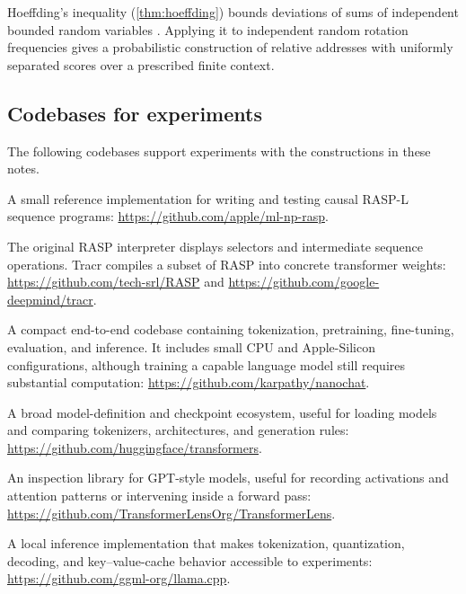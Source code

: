 \documentclass[11pt,twoside]{article}
\theoremstyle{plain}
\theoremstyle{definition}
\theoremstyle{remark}
\begin{document}
Hoeffding's inequality (\cref{thm:hoeffding}) bounds deviations of sums of
independent bounded random variables \citep{hoeffding1963}. Applying it to independent
random rotation frequencies gives a probabilistic construction of relative
addresses with uniformly separated scores over a prescribed finite context.

\subsection*{Codebases for experiments}
\label{app:experimental-codebases}

The following codebases support experiments with the constructions in these notes.
\begin{description}[style=nextline,leftmargin=1.5em,labelindent=0pt]
\item[NumPy RASP-L]
A small reference implementation for writing and testing causal RASP-L
sequence programs: \url{https://github.com/apple/ml-np-rasp}.
\item[RASP and Tracr]
The original RASP interpreter displays selectors and intermediate sequence
operations. Tracr compiles a subset of RASP into concrete transformer weights:
\url{https://github.com/tech-srl/RASP} and
\url{https://github.com/google-deepmind/tracr}.
\item[nanochat]
A compact end-to-end codebase containing tokenization, pretraining,
fine-tuning, evaluation, and inference. It includes small CPU and
Apple-Silicon configurations, although training a capable language model still
requires substantial computation: \url{https://github.com/karpathy/nanochat}.
\item[Hugging Face Transformers]
A broad model-definition and checkpoint ecosystem, useful for loading models
and comparing tokenizers, architectures, and generation rules:
\url{https://github.com/huggingface/transformers}.
\item[TransformerLens]
An inspection library for GPT-style models, useful for recording activations
and attention patterns or intervening inside a forward pass:
\url{https://github.com/TransformerLensOrg/TransformerLens}.
\item[llama.cpp]
A local inference implementation that makes tokenization, quantization,
decoding, and key--value-cache behavior accessible to experiments:
\url{https://github.com/ggml-org/llama.cpp}.
\end{description}
\end{document}
